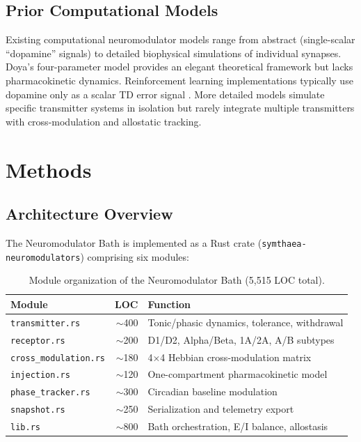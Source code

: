 \documentclass[11pt,a4paper]{article}
\begin{document}
\subsection{Prior Computational Models}

Existing computational neuromodulator models range from abstract (single-scalar ``dopamine'' signals) to detailed biophysical simulations of individual synapses. Doya's four-parameter model \citep{doya2002} provides an elegant theoretical framework but lacks pharmacokinetic dynamics. Reinforcement learning implementations typically use dopamine only as a scalar TD error signal \citep{sutton1998}. More detailed models simulate specific transmitter systems in isolation \citep{humphries2009} but rarely integrate multiple transmitters with cross-modulation and allostatic tracking.

\section{Methods}

\subsection{Architecture Overview}

The Neuromodulator Bath is implemented as a Rust crate (\texttt{symthaea-neuromodulators}) comprising six modules:

\begin{table}[h]
\centering
\caption{Module organization of the Neuromodulator Bath (5,515 LOC total).}
\label{tab:modules}
\begin{tabular}{lrl}
\toprule
\textbf{Module} & \textbf{LOC} & \textbf{Function} \\
\midrule
\texttt{transmitter.rs} & $\sim$400 & Tonic/phasic dynamics, tolerance, withdrawal \\
\texttt{receptor.rs} & $\sim$200 & D1/D2, Alpha/Beta, 1A/2A, A/B subtypes \\
\texttt{cross\_modulation.rs} & $\sim$180 & 4$\times$4 Hebbian cross-modulation matrix \\
\texttt{injection.rs} & $\sim$120 & One-compartment pharmacokinetic model \\
\texttt{phase\_tracker.rs} & $\sim$300 & Circadian baseline modulation \\
\texttt{snapshot.rs} & $\sim$250 & Serialization and telemetry export \\
\texttt{lib.rs} & $\sim$800 & Bath orchestration, E/I balance, allostasis \\
\bottomrule
\end{tabular}
\end{table}
\end{document}
